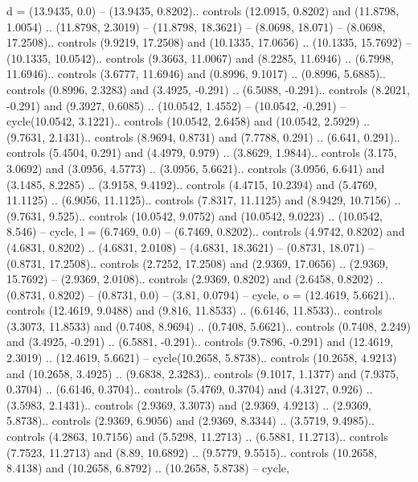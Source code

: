 {d} = {(13.9435, 0.0) -- (13.9435, 0.8202).. controls (12.0915, 0.8202) and (11.8798, 1.0054) .. (11.8798, 2.3019) -- (11.8798, 18.3621) -- (8.0698, 18.071) -- (8.0698, 17.2508).. controls (9.9219, 17.2508) and (10.1335, 17.0656) .. (10.1335, 15.7692) -- (10.1335, 10.0542).. controls (9.3663, 11.0067) and (8.2285, 11.6946) .. (6.7998, 11.6946).. controls (3.6777, 11.6946) and (0.8996, 9.1017) .. (0.8996, 5.6885).. controls (0.8996, 2.3283) and (3.4925, -0.291) .. (6.5088, -0.291).. controls (8.2021, -0.291) and (9.3927, 0.6085) .. (10.0542, 1.4552) -- (10.0542, -0.291) -- cycle(10.0542, 3.1221).. controls (10.0542, 2.6458) and (10.0542, 2.5929) .. (9.7631, 2.1431).. controls (8.9694, 0.8731) and (7.7788, 0.291) .. (6.641, 0.291).. controls (5.4504, 0.291) and (4.4979, 0.979) .. (3.8629, 1.9844).. controls (3.175, 3.0692) and (3.0956, 4.5773) .. (3.0956, 5.6621).. controls (3.0956, 6.641) and (3.1485, 8.2285) .. (3.9158, 9.4192).. controls (4.4715, 10.2394) and (5.4769, 11.1125) .. (6.9056, 11.1125).. controls (7.8317, 11.1125) and (8.9429, 10.7156) .. (9.7631, 9.525).. controls (10.0542, 9.0752) and (10.0542, 9.0223) .. (10.0542, 8.546) -- cycle},
{l} = {(6.7469, 0.0) -- (6.7469, 0.8202).. controls (4.9742, 0.8202) and (4.6831, 0.8202) .. (4.6831, 2.0108) -- (4.6831, 18.3621) -- (0.8731, 18.071) -- (0.8731, 17.2508).. controls (2.7252, 17.2508) and (2.9369, 17.0656) .. (2.9369, 15.7692) -- (2.9369, 2.0108).. controls (2.9369, 0.8202) and (2.6458, 0.8202) .. (0.8731, 0.8202) -- (0.8731, 0.0) -- (3.81, 0.0794) -- cycle},
{o} = {(12.4619, 5.6621).. controls (12.4619, 9.0488) and (9.816, 11.8533) .. (6.6146, 11.8533).. controls (3.3073, 11.8533) and (0.7408, 8.9694) .. (0.7408, 5.6621).. controls (0.7408, 2.249) and (3.4925, -0.291) .. (6.5881, -0.291).. controls (9.7896, -0.291) and (12.4619, 2.3019) .. (12.4619, 5.6621) -- cycle(10.2658, 5.8738).. controls (10.2658, 4.9213) and (10.2658, 3.4925) .. (9.6838, 2.3283).. controls (9.1017, 1.1377) and (7.9375, 0.3704) .. (6.6146, 0.3704).. controls (5.4769, 0.3704) and (4.3127, 0.926) .. (3.5983, 2.1431).. controls (2.9369, 3.3073) and (2.9369, 4.9213) .. (2.9369, 5.8738).. controls (2.9369, 6.9056) and (2.9369, 8.3344) .. (3.5719, 9.4985).. controls (4.2863, 10.7156) and (5.5298, 11.2713) .. (6.5881, 11.2713).. controls (7.7523, 11.2713) and (8.89, 10.6892) .. (9.5779, 9.5515).. controls (10.2658, 8.4138) and (10.2658, 6.8792) .. (10.2658, 5.8738) -- cycle},
